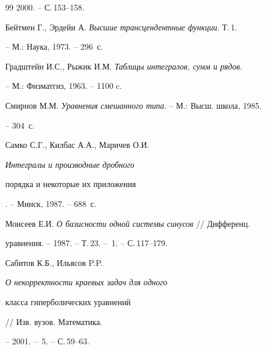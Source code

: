 \begin{thebibliography}{99}
2000. -- С.\,153--158.




Бейтмен Г., Эрдейи А. {\em Высшие трансцендентные функции}. Т.\,1.


-- М.: Наука, 1973. -- 296~с. 




Градштейн И.С., Рыжик И.М. {\em Таблицы интегралов, сумм и рядов}.


-- М.: Физматгиз, 1963. -- 1100 c.




Смирнов М.М. {\em Уравнения смешанного типа}. -- М.: Высш. школа, 1985.


-- 304~с.




Самко С.Г., Килбас А.А., Маричев О.И. {\em Интегралы и производные дробного 


порядка и некоторые их приложения}. -- Минск, 1987. -- 688~с.




Моисеев Е.И. {\em О базисности одной системы синусов} // Дифференц. 


уравнения. -- 1987. -- Т.\,23. -- \No\,1. -- С.\,117--179.




Сабитов К.Б., Ильясов P.P. {\em О некорректности краевых задач для одного 


класса гиперболических уравнений} // Изв. вузов. Математика.


-- 2001. -- \No\,5. -- С.\,59--63.





\end{thebibliography}





\vskip 2cm









\smallskip









\label{end}





